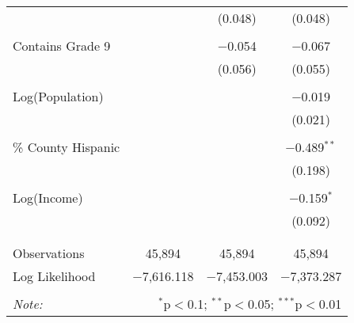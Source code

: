 \begin{table}[!htbp]
\begin{tabular}{@{\extracolsep{-2pt}}lccc}
  &  & (0.048) & (0.048) \\ 
  & & & \\ 
 Contains Grade 9 &  & $-$0.054 & $-$0.067 \\ 
  &  & (0.056) & (0.055) \\ 
  & & & \\ 
 Log(Population) &  &  & $-$0.019 \\ 
  &  &  & (0.021) \\ 
  & & & \\ 
 \% County Hispanic &  &  & $-$0.489$^{**}$ \\ 
  &  &  & (0.198) \\ 
  & & & \\ 
 Log(Income) &  &  & $-$0.159$^{*}$ \\ 
  &  &  & (0.092) \\ 
  & & & \\ 
\hline \\[-1.8ex] 
Observations & 45,894 & 45,894 & 45,894 \\ 
Log Likelihood & $-$7,616.118 & $-$7,453.003 & $-$7,373.287 \\ 
\hline 
\hline \\[-1.8ex] 
\textit{Note:}  & \multicolumn{3}{r}{$^{*}$p$<$0.1; $^{**}$p$<$0.05; $^{***}$p$<$0.01} \\ 
\end{tabular} 
\end{table} 

